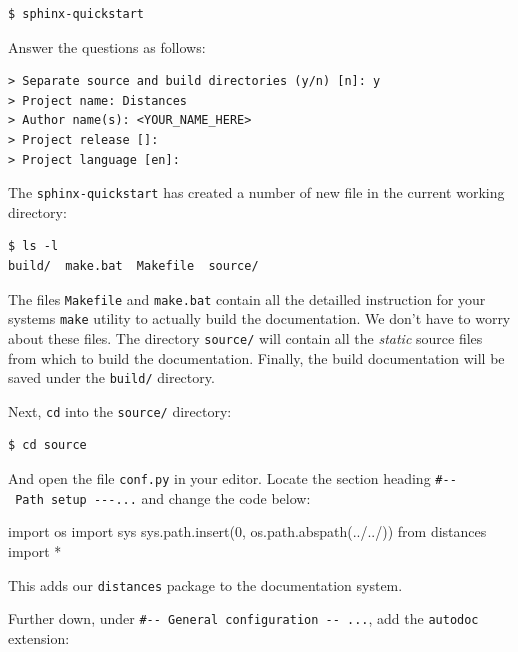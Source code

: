 \documentclass[11pt]{article}
\newenvironment{Shaded}{}{}
\newcommand{\DecValTok}[1]{\textcolor[rgb]{0.25,0.63,0.44}{{#1}}}
\newcommand{\StringTok}[1]{\textcolor[rgb]{0.25,0.44,0.63}{{#1}}}
\newcommand{\NormalTok}[1]{{#1}}
\newcommand{\ImportTok}[1]{{#1}}
\newcommand{\OperatorTok}[1]{\textcolor[rgb]{0.40,0.40,0.40}{{#1}}}
\begin{document}
\begin{verbatim}
$ sphinx-quickstart
\end{verbatim}

Answer the questions as follows:

\begin{verbatim}
> Separate source and build directories (y/n) [n]: y
> Project name: Distances
> Author name(s): <YOUR_NAME_HERE>
> Project release []: 
> Project language [en]: 
\end{verbatim}

The \texttt{sphinx-quickstart} has created a number of new file in the
current working directory:

\begin{verbatim}
$ ls -l
build/  make.bat  Makefile  source/
\end{verbatim}

The files \texttt{Makefile} and \texttt{make.bat} contain all the
detailled instruction for your systems \texttt{make} utility to actually
build the documentation. We don't have to worry about these files. The
directory \texttt{source/} will contain all the \emph{static} source
files from which to build the documentation. Finally, the build
documentation will be saved under the \texttt{build/} directory.

Next, \texttt{cd} into the \texttt{source/} directory:

\begin{verbatim}
$ cd source
\end{verbatim}

And open the file \texttt{conf.py} in your editor. Locate the section
heading \texttt{\#-\/-\ Path\ setup\ -\/-\/-...} and change the code
below:

\begin{Shaded}
\begin{Highlighting}[]
\ImportTok{import}\NormalTok{ os}
\ImportTok{import}\NormalTok{ sys}
\NormalTok{sys.path.insert(}\DecValTok{0}\NormalTok{, os.path.abspath(}\StringTok{\textquotesingle{}../../\textquotesingle{}}\NormalTok{))}
\ImportTok{from}\NormalTok{ distances }\ImportTok{import} \OperatorTok{*}
\end{Highlighting}
\end{Shaded}

This adds our \texttt{distances} package to the documentation system.

Further down, under \texttt{\#-\/-\ General\ configuration\ -\/-\ ...},
add the \texttt{autodoc} extension:
\end{document}
